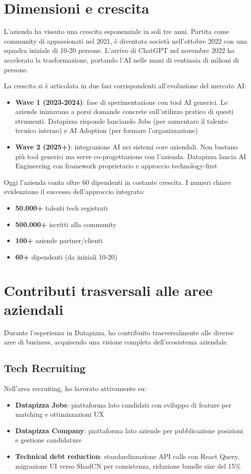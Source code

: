 \section{Dimensioni e crescita}
L'azienda ha vissuto una crescita esponenziale in soli tre anni. Partita come community di appassionati nel 2021, è diventata società nell'ottobre 2022 con una squadra iniziale di 10-20 persone. L'arrivo di ChatGPT nel novembre 2022 ha accelerato la trasformazione, portando l'AI nelle mani di centinaia di milioni di persone.

La crescita si è articolata in due fasi corrispondenti all'evoluzione del mercato AI:
\begin{itemize}
  \item \textbf{Wave 1 (2023-2024)}: fase di sperimentazione con tool AI generici. Le aziende iniziavano a porsi domande concrete sull'utilizzo pratico di questi strumenti. Datapizza risponde lanciando Jobs (per aumentare il talento tecnico interno) e AI Adoption (per formare l'organizzazione)
  
  \item \textbf{Wave 2 (2025+)}: integrazione AI nei sistemi core aziendali. Non bastano più tool generici ma serve co-progettazione con l'azienda. Datapizza lancia AI Engineering con framework proprietario e approccio technology-first
\end{itemize}

Oggi l'azienda conta oltre 60 dipendenti in costante crescita. I numeri chiave evidenziano il successo dell'approccio integrato:
\begin{itemize}
  \item \textbf{50.000+} talenti tech registrati
  \item \textbf{500.000+} iscritti alla community
  \item \textbf{100+} aziende partner/clienti
  \item \textbf{60+} dipendenti (da iniziali 10-20)
\end{itemize}

\section{Contributi trasversali alle aree aziendali}
Durante l'esperienza in Datapizza, ho contribuito trasversalmente alle diverse aree di business, acquisendo una visione completa dell'ecosistema aziendale.

\subsection{Tech Recruiting}
Nell'area recruiting, ho lavorato attivamente su:
\begin{itemize}
  \item \textbf{Datapizza Jobs}: piattaforma lato candidati con sviluppo di feature per matching e ottimizzazioni UX
  \item \textbf{Datapizza Company}: piattaforma lato aziende per pubblicazione posizioni e gestione candidature
  \item \textbf{Technical debt reduction}: standardizzazione API calls con React Query, migrazione UI verso ShadCN per consistenza, riduzione bundle size del 15\%
\end{itemize}

